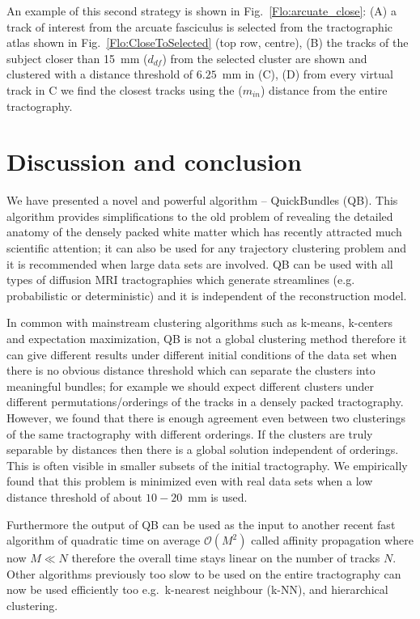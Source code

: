 \documentclass[preprint,authoryear,a4paper,10pt,onecolumn]{elsarticle}
\begin{document}
An example of this second strategy is shown in
Fig.~\ref{Flo:arcuate_close}: (A) a track of interest from the arcuate
fasciculus is selected from the tractographic atlas shown in
Fig.~\ref{Flo:CloseToSelected} (top row, centre), (B) the tracks of the
subject closer than 15~mm ($d_{df}$) from the selected cluster are shown
and clustered with a distance threshold of $6.25$~mm in (C), (D) from
every virtual track in C we find the closest tracks using the
($m_{in}$) distance from the entire tractography.

\section{Discussion and conclusion}

We have presented a novel and powerful algorithm -- QuickBundles
(QB). This algorithm provides simplifications to the old problem of
revealing the detailed anatomy of the densely packed white matter which
has recently attracted much scientific attention; it can also be used
for any trajectory clustering problem and it is recommended when large
data sets are involved. QB can be used with all types of diffusion MRI
tractographies which generate streamlines (e.g. probabilistic or
deterministic) and it is independent of the reconstruction model.

In common with mainstream clustering algorithms such as k-means,
k-centers and expectation maximization, QB is not a global clustering
method therefore it can give different results under different initial
conditions of the data set when there is no obvious distance threshold
which can separate the clusters into meaningful bundles; for example we
should expect different clusters under different permutations/orderings
of the tracks in a densely packed tractography. However, we found that
there is enough agreement even between two clusterings of the same
tractography with different orderings. If the clusters are truly
separable by distances then there is a global solution independent of
orderings. This is often visible in smaller subsets of the initial
tractography. We empirically found that this problem is minimized even
with real data sets when a low distance threshold of about $10-20$~mm is
used.

Furthermore the output of QB can be used as the input to another recent
fast algorithm of quadratic time on average $\mathcal{O}(M^{2})$ called affinity
propagation where now $M\ll N$ therefore the overall time stays linear
on the number of tracks $N$. Other algorithms previously too slow to be
used on the entire tractography can now be used efficiently too
e.g.~k-nearest neighbour (k-NN), and hierarchical clustering.
\end{document}
